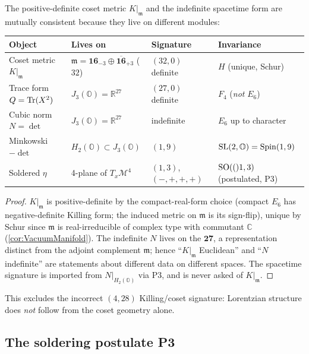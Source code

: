 \begin{theorem}
\label{thm:spacetime:consistent}
The positive-definite coset metric $K|_{\mathfrak m}$ and the indefinite spacetime
form are mutually consistent because they live on different modules:
\begin{center}\renewcommand{\arraystretch}{1.25}
\begin{tabular}{@{}llll@{}}
\toprule
Object & Lives on & Signature & Invariance \\
\midrule
Coset metric $K|_{\mathfrak m}$ & $\mathfrak m=\mathbf{16}_{-3}\oplus\overline{\mathbf{16}}_{+3}$ ($32$) & $(32,0)$ definite & $H$ (unique, Schur)\\
Trace form $Q=\operatorname{Tr}(X^2)$ & $J_3(\mathbb O)=\mathbb R^{27}$ & $(27,0)$ definite & $F_4$ (\emph{not} $E_6$)\\
Cubic norm $N=\det$ & $J_3(\mathbb O)=\mathbb R^{27}$ & indefinite & $E_6$ up to character\\
Minkowski $-\det$ & $H_2(\mathbb O)\subset J_3(\mathbb O)$ & $(1,9)$ & $\mathrm{SL}(2,\mathbb O)=\operatorname{Spin}(1,9)$\\
Soldered $\eta$ & 4-plane of $T_x\mathcal M^4$ & $(1,3)$, $(-,+,+,+)$ & $\mathrm{SO}(()1,3)$ (postulated, P3)\\
\bottomrule
\end{tabular}
\end{center}
\end{theorem}
\begin{proof}
$K|_{\mathfrak m}$ is positive-definite by the compact-real-form choice (compact $E_6$
has negative-definite Killing form; the induced metric on $\mathfrak m$ is its
sign-flip), unique by Schur since $\mathfrak m$ is real-irreducible of complex type with
commutant $\mathbb C$ (\autoref{cor:VacuumManifold}). The indefinite $N$ lives on the
$\mathbf{27}$, a representation distinct from the adjoint complement $\mathfrak m$;
hence ``$K|_{\mathfrak m}$ Euclidean'' and ``$N$ indefinite'' are statements about
different data on different spaces. The spacetime signature is imported from
$N|_{H_2(\mathbb O)}$ via P3, and is never asked of $K|_{\mathfrak m}$.
\end{proof}

This excludes the incorrect $(4,28)$ Killing/coset signature: Lorentzian structure does
\emph{not} follow from the coset geometry alone.

\subsection{The soldering postulate P3}
\label{sec:spacetime:P3}

